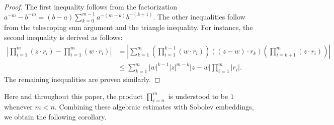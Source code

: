 \documentclass{article}
\theoremstyle{remark}
\theoremstyle{definition}
\numberwithin{equation}{section}
\begin{document}
\begin{proof}
    The first inequality follows from the factorization $a^{-m} - b^{-m} = (b-a) \sum_{k=0}^{m-1} a^{-(m-k)} b^{-(k+1)}$.
    The other inequalities follow from the telescoping sum argument and the triangle inequality.
    For instance, the second inequality is derived as follows:
    \begin{align*}
        \left|\prod_{i=1}^m(z\cdot r_i)-\prod_{i=1}^m(w\cdot r_i)\right|
        &= \left|\sum_{k=1}^m \left( \prod_{i=1}^{k-1} (w \cdot r_i) \right) ((z-w) \cdot r_k) \left( \prod_{i=k+1}^m (z \cdot r_i) \right)\right| \\
        &\le \sum_{k=1}^m |w|^{k-1} |z|^{m-k} |z-w| \prod_{i=1}^m |r_i|.
    \end{align*}
    The remaining inequalities are proven similarly.
\end{proof}

Here and throughout this paper, the product $\prod_{i=n}^m$ is understood to be $1$ whenever $m < n$.
Combining these algebraic estimates with Sobolev embeddings, we obtain the following corollary.
\end{document}
